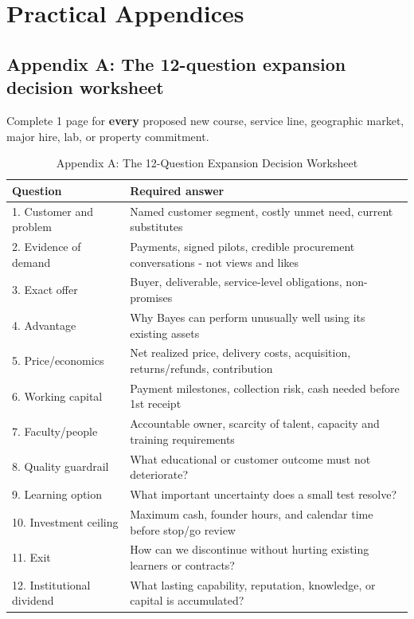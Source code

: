 
\section*{Practical Appendices}

\subsection{Appendix A: The 12-question expansion decision worksheet}

Complete 1 page for \textbf{every} proposed new course, service line, geographic market, major hire, lab, or property commitment.

\begin{table}[t]
\centering
\small
\caption{Appendix A: The 12-Question Expansion Decision Worksheet}
\label{tab:ch36_expansion_worksheet}
\begin{tabularx}{\textwidth}{p{4.0cm} X}
\toprule
\textbf{ Question } & \textbf{ Required answer } \\
\midrule
 1. Customer and problem  &  Named customer segment, costly unmet need, current substitutes  \\
 2. Evidence of demand  &  Payments, signed pilots, credible procurement conversations - not views and likes  \\
 3. Exact offer  &  Buyer, deliverable, service-level obligations, non-promises  \\
 4. Advantage  &  Why Bayes can perform unusually well using its existing assets  \\
 5. Price/\allowbreak economics  &  Net realized price, delivery costs, acquisition, returns/\allowbreak refunds, contribution  \\
 6. Working capital  &  Payment milestones, collection risk, cash needed before 1st receipt  \\
 7. Faculty/\allowbreak people  &  Accountable owner, scarcity of talent, capacity and training requirements  \\
 8. Quality guardrail  &  What educational or customer outcome must not deteriorate?  \\
 9. Learning option  &  What important uncertainty does a small test resolve?  \\
 10. Investment ceiling  &  Maximum cash, founder hours, and calendar time before stop/\allowbreak go review  \\
 11. Exit  &  How can we discontinue without hurting existing learners or contracts?  \\
 12. Institutional dividend  &  What lasting capability, reputation, knowledge, or capital is accumulated?  \\
\bottomrule
\end{tabularx}
\end{table}

